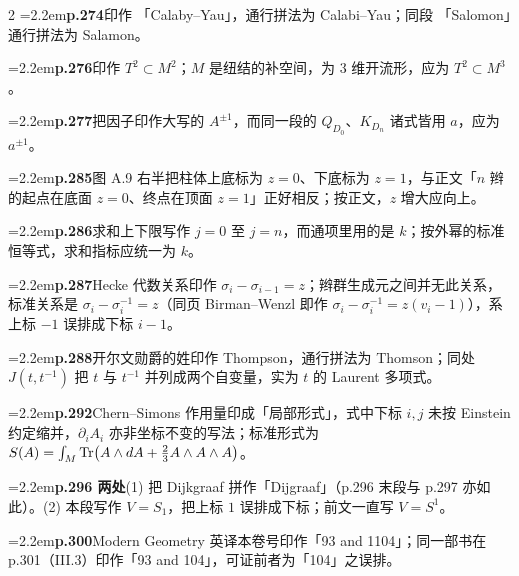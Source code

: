 \begin{multicols}{2}
\noindent\hangindent=2.2em\textbf{p.274}\quad 印作 「Calaby--Yau」，通行拼法为 Calabi--Yau；同段 「Salomon」通行拼法为 Salamon。\par

\noindent\hangindent=2.2em\textbf{p.276}\quad 印作 $T^2\subset M^2$；$M$ 是纽结的补空间，为 3 维开流形，应为 $T^2\subset M^3$。\par

\noindent\hangindent=2.2em\textbf{p.277}\quad 把因子印作大写的 $A^{\pm1}$，而同一段的 $Q_{D_0}$、$K_{D_n}$ 诸式皆用 $a$，应为 $a^{\pm1}$。\par

\noindent\hangindent=2.2em\textbf{p.285}\quad 图 A.9 右半把柱体上底标为 $z=0$、下底标为 $z=1$，与正文「$n$ 辫的起点在底面 $z=0$、终点在顶面 $z=1$」正好相反；按正文，$z$ 增大应向上。\par

\noindent\hangindent=2.2em\textbf{p.286}\quad 求和上下限写作 $j=0$ 至 $j=n$，而通项里用的是 $k$；按外幂的标准恒等式，求和指标应统一为 $k$。\par

\noindent\hangindent=2.2em\textbf{p.287}\quad Hecke 代数关系印作 $\sigma_i-\sigma_{i-1}=z$；辫群生成元之间并无此关系，标准关系是 $\sigma_i-\sigma_i^{-1}=z$（同页 Birman--Wenzl 即作 $\sigma_i-\sigma_i^{-1}=z(v_i-1)$），系上标 $-1$ 误排成下标 $i-1$。\par

\noindent\hangindent=2.2em\textbf{p.288}\quad 开尔文勋爵的姓印作 Thompson，通行拼法为 Thomson；同处 $J(t,t^{-1})$ 把 $t$ 与 $t^{-1}$ 并列成两个自变量，实为 $t$ 的 Laurent 多项式。\par

\noindent\hangindent=2.2em\textbf{p.292}\quad Chern--Simons 作用量印成「局部形式」，式中下标 $i,j$ 未按 Einstein 约定缩并，$\partial_iA_i$ 亦非坐标不变的写法；标准形式为 $S(A)=\int_M\operatorname{Tr}\bigl(A\wedge dA+\frac23A\wedge A\wedge A\bigr)$。\par

\noindent\hangindent=2.2em\textbf{p.296 两处}\quad (1) 把 Dijkgraaf 拼作「Dijgraaf」（p.296 末段与 p.297 亦如此）。(2) 本段写作 $V=S_1$，把上标 $1$ 误排成下标；前文一直写 $V=S^1$。\par

\noindent\hangindent=2.2em\textbf{p.300}\quad Modern Geometry 英译本卷号印作「93 and 1104」；同一部书在 p.301（III.3）印作「93 and 104」，可证前者为「104」之误排。\par


\end{multicols}
